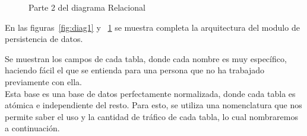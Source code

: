     \begin{figure}[htbp!]
    	\begin{center}
    		\caption{Parte 2 del diagrama Relacional}
    		\label{fig:diag2}
    	\end{center}
    \end{figure}
    
    En las figuras~\ref{fig:diag1} y ~\ref{fig:diag2} se muestra completa la arquitectura del modulo de persistencia de datos.
    
    Se muestran los campos de cada tabla, donde cada nombre es muy específico, haciendo fácil el que se entienda para una persona que no ha trabajado previamente con ella. \\
    Esta base es una base de datos perfectamente normalizada, donde cada tabla es atómica e independiente del resto. Para esto, se utiliza una nomenclatura que nos permite saber el uso y la cantidad de tráfico de cada tabla, lo cual nombraremos a continuación.
    
